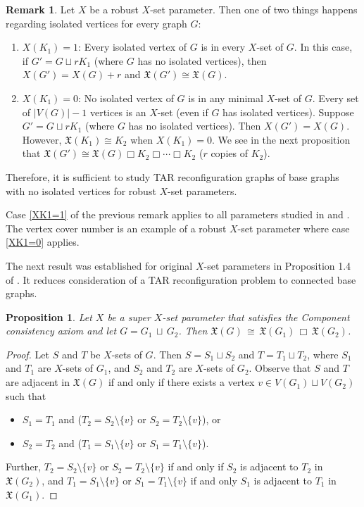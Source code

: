 \documentclass{article}
\def\blu{\color{blue}}
\numberwithin{figure}{section}
\numberwithin{table}{section}
\numberwithin{equation}{section}
\newtheorem{prop}[thm]{Proposition}
\theoremstyle{definition}
\newtheorem{rem}[thm]{Remark}
\theoremstyle{definition}
\theoremstyle{definition}
\newcommand {\du} {\,\sqcup\,}
\newcommand{\ben}{\begin{enumerate}}
\newcommand{\een}{\end{enumerate}}
\newcommand{\xtar}{\mathfrak{X}}%
\begin{document}
{%


\begin{rem}\label{no-isol-vtx-2}    Let $X$ be a robust $X$-set parameter.
Then one of two things happens regarding isolated vertices for every graph $G$:
\ben[$(1)$]
\item\label{XK1=1}    \cite[Remark 2.3]{PDrecon} $X(K_1)=1$: Every isolated vertex of $G$ is in every $X$-set of $G$.  In this case, if $G'=G\sqcup rK_1$ (where $G$ has no isolated vertices), then $X(G')=X(G)+r$ and 
$\xtar(G')\cong\xtar(G)$.  
\item\label{XK1=0} $X(K_1)=0$: No isolated vertex of $G$ is in any minimal $X$-set of $G$.  Every set of $|V(G)|-1$ vertices is an $X$-set (even if $G$ has isolated vertices). Suppose $G'=G\sqcup rK_1$ (where $G$ has no isolated vertices).  Then $X(G')=X(G)$.  However, $\xtar(K_1)\cong K_2$ when $X(K_1)=0$.  We see in  the next proposition %
 that 
$\xtar(G')\cong\xtar(G)\Box K_2 \Box \cdots\Box K_2$ ($r$ copies of $K_2$). 
\een
 Therefore, it is sufficient to study  TAR reconfiguration graphs of base graphs with no isolated vertices  for robust $X$-set parameters. 
\end{rem}

Case \eqref{XK1=1} of the previous remark applies  to all parameters studied in \cite{PDrecon} and \cite{XTARiso}.  The vertex cover number  is an example of  a robust $X$-set parameter where case \eqref{XK1=0} applies.

The next result was established for original $X$-set parameters in Proposition 1.4 of \cite{XTARiso}. It reduces consideration of a TAR reconfiguration problem to connected base graphs. 

\begin{prop}\label{p:disjoint- cart-u}
Let $X$ be a super $X$-set parameter that satisfies the Component consistency  axiom and let $G = G_1\du G_2$. Then $\xtar(G)  \,\cong\, \xtar(G_1)\,\Box\,\xtar(G_2)$.
\end{prop} 
{\blu \begin{proof}
Let $S$ and $T$ be $X$-sets of $G$. Then $S = S_1\sqcup S_2$ and $T = T_1 \sqcup T_2$, where $S_1$ and $T_1$ are $X$-sets of $G_1$, and $S_2$ and $T_2$ are $X$-sets of $G_2$. Observe that $S$ and $T$ are adjacent in $\xtar(G)$ if and only if there exists a vertex $v\in V(G_1)\sqcup V(G_2)$ such that
\begin{itemize}
    \item $S_1 = T_1$ and ($ T_2=S_2\setminus \{v\}$ or $S_2 = T_2\setminus \{v\}$), or
    \item $S_2 = T_2$ and ($ T_1=S_1\setminus \{v\} $ or $S_1 = T_1\setminus \{v\}$).
\end{itemize}
Further, $ T_2=S_2\setminus \{v\}$ or $S_2 = T_2\setminus \{v\}$ if and only if $S_2$ is adjacent to $T_2$ in $\xtar(G_2)$, and $ T_1=S_1\setminus \{v\} $ or $S_1 = T_1\setminus \{v\}$ if and only $S_1$ is adjacent to $T_1$ in $\xtar(G_1)$.
\end{proof}}

}
\end{document}

